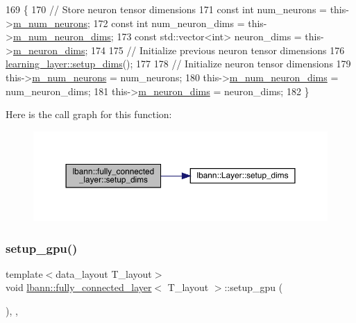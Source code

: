 \begin{DoxyCode}
169                              \{
170     \textcolor{comment}{// Store neuron tensor dimensions}
171     \textcolor{keyword}{const} \textcolor{keywordtype}{int} num\_neurons = this->\hyperlink{classlbann_1_1Layer_a6b5ebc8a7d9329d8a773ed787e7b41d8}{m\_num\_neurons};
172     \textcolor{keyword}{const} \textcolor{keywordtype}{int} num\_neuron\_dims = this->\hyperlink{classlbann_1_1Layer_adfd6178d21498c9095cd947ae1eb2d6a}{m\_num\_neuron\_dims};
173     \textcolor{keyword}{const} std::vector<int> neuron\_dims = this->\hyperlink{classlbann_1_1Layer_abb34bb8031f57a483e2e327a5f229f48}{m\_neuron\_dims};
174 
175     \textcolor{comment}{// Initialize previous neuron tensor dimensions}
176     \hyperlink{classlbann_1_1Layer_a90fce1b06c1f2abb480e18cfe08a9746}{learning\_layer::setup\_dims}();
177 
178     \textcolor{comment}{// Initialize neuron tensor dimensions}
179     this->\hyperlink{classlbann_1_1Layer_a6b5ebc8a7d9329d8a773ed787e7b41d8}{m\_num\_neurons} = num\_neurons;
180     this->\hyperlink{classlbann_1_1Layer_adfd6178d21498c9095cd947ae1eb2d6a}{m\_num\_neuron\_dims} = num\_neuron\_dims;
181     this->\hyperlink{classlbann_1_1Layer_abb34bb8031f57a483e2e327a5f229f48}{m\_neuron\_dims} = neuron\_dims;
182   \}
\end{DoxyCode}
Here is the call graph for this function\+:\nopagebreak
\begin{figure}[H]
\begin{center}
\leavevmode
\includegraphics[width=350pt]{classlbann_1_1fully__connected__layer_aaf38e55b232b1bb2a6336ff1807b5a17_cgraph}
\end{center}
\end{figure}
\mbox{\label{classlbann_1_1fully__connected__layer_a95c96742a67f2e9398e608b244c2d121}} 
\subsubsection{\texorpdfstring{setup\+\_\+gpu()}{setup\_gpu()}}
{\footnotesize\ttfamily template$<$data\+\_\+layout T\+\_\+layout$>$ \\
void \hyperlink{classlbann_1_1fully__connected__layer}{lbann\+::fully\+\_\+connected\+\_\+layer}$<$ T\+\_\+layout $>$\+::setup\+\_\+gpu (\begin{DoxyParamCaption}{ }\end{DoxyParamCaption})\hspace{0.3cm}{\ttfamily [inline]}, {\ttfamily [override]}, {\ttfamily [virtual]}}

